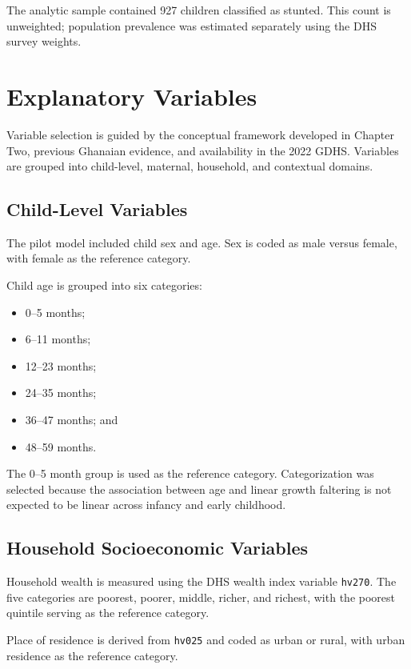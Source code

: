 The analytic sample contained 927 children classified as stunted. This count is unweighted; population prevalence was estimated separately using the DHS survey weights.

\section{Explanatory Variables}

Variable selection is guided by the conceptual framework developed in Chapter Two, previous Ghanaian evidence, and availability in the 2022 GDHS. Variables are grouped into child-level, maternal, household, and contextual domains.

\subsection{Child-Level Variables}

The pilot model included child sex and age. Sex is coded as male versus female, with female as the reference category.

Child age is grouped into six categories:

\begin{itemize}
    \item 0--5 months;
    \item 6--11 months;
    \item 12--23 months;
    \item 24--35 months;
    \item 36--47 months; and
    \item 48--59 months.
\end{itemize}

The 0--5 month group is used as the reference category. Categorization was selected because the association between age and linear growth faltering is not expected to be linear across infancy and early childhood.

\subsection{Household Socioeconomic Variables}

Household wealth is measured using the DHS wealth index variable \texttt{hv270}. The five categories are poorest, poorer, middle, richer, and richest, with the poorest quintile serving as the reference category.

Place of residence is derived from \texttt{hv025} and coded as urban or rural, with urban residence as the reference category.

